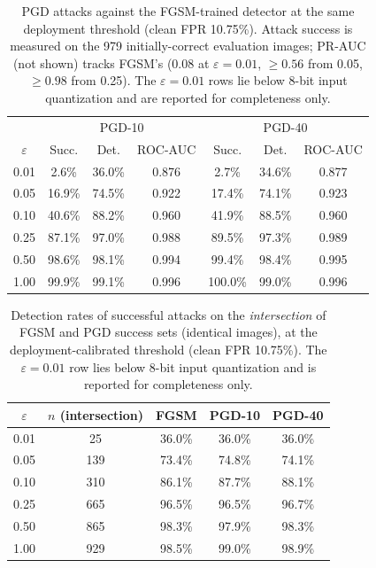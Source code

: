 \documentclass[runningheads]{llncs}
\begin{document}
\begin{table}
\centering
\caption{PGD attacks against the FGSM-trained detector at the same
deployment threshold (clean FPR 10.75\%). Attack success is measured on
the 979 initially-correct evaluation images; PR-AUC (not shown) tracks
FGSM's (0.08 at $\varepsilon=0.01$, $\ge 0.56$ from 0.05, $\ge 0.98$
from 0.25). The $\varepsilon=0.01$ rows lie below 8-bit input
quantization and are reported for completeness only.}
\label{tab:pgd}
\begin{tabular}{ccccccc}
\toprule
& \multicolumn{3}{c}{PGD-10} & \multicolumn{3}{c}{PGD-40} \\
$\varepsilon$ & Succ. & Det. & ROC-AUC & Succ. & Det. & ROC-AUC \\
\midrule
0.01 & 2.6\%  & 36.0\% & 0.876 & 2.7\%   & 34.6\% & 0.877 \\
0.05 & 16.9\% & 74.5\% & 0.922 & 17.4\%  & 74.1\% & 0.923 \\
0.10 & 40.6\% & 88.2\% & 0.960 & 41.9\%  & 88.5\% & 0.960 \\
0.25 & 87.1\% & 97.0\% & 0.988 & 89.5\%  & 97.3\% & 0.989 \\
0.50 & 98.6\% & 98.1\% & 0.994 & 99.4\%  & 98.4\% & 0.995 \\
1.00 & 99.9\% & 99.1\% & 0.996 & 100.0\% & 99.0\% & 0.996 \\
\bottomrule
\end{tabular}
\end{table}

\begin{table}
\centering
\caption{Detection rates of successful attacks on the
\emph{intersection} of FGSM and PGD success sets (identical images), at
the deployment-calibrated threshold (clean FPR 10.75\%). The
$\varepsilon=0.01$ row lies below 8-bit input quantization and is
reported for completeness only.}
\label{tab:intersection}
\begin{tabular}{ccccc}
\toprule
$\varepsilon$ & $n$ (intersection) & FGSM & PGD-10 & PGD-40 \\
\midrule
0.01 & 25  & 36.0\% & 36.0\% & 36.0\% \\
0.05 & 139 & 73.4\% & 74.8\% & 74.1\% \\
0.10 & 310 & 86.1\% & 87.7\% & 88.1\% \\
0.25 & 665 & 96.5\% & 96.5\% & 96.7\% \\
0.50 & 865 & 98.3\% & 97.9\% & 98.3\% \\
1.00 & 929 & 98.5\% & 99.0\% & 98.9\% \\
\bottomrule
\end{tabular}
\end{table}
\end{document}
